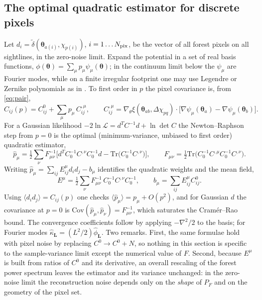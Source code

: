 \documentclass[11pt,a4paper]{article}
\newcommand{\dt}{\tilde\delta}
\newcommand{\vL}{\bm{L}}
\newcommand{\vth}{\bm{\theta}}
\newcommand{\Tr}{\mathrm{Tr}}
\begin{document}
\subsection{The optimal quadratic estimator for discrete pixels}
\label{sec:discrete}

Let $d_i=\dt(\vth_{a(i)},\chi_{p(i)})$, $i=1\dots N_{\rm pix}$, be the vector of all forest pixels on all sightlines, in the zero-noise limit. Expand the potential in a set of real basis functions, $\phi(\vth)=\sum_\mu p_\mu\psi_\mu(\vth)$; in the continuum limit below the $\psi_\mu$ are Fourier modes, while on a finite irregular footprint one may use Legendre or Zernike polynomials as in \citet{2005.04109}. To first order in $p$ the pixel covariance is, from \eqref{eq:pair},
\begin{equation}
C_{ij}(p)=C^0_{ij}+\sum_\mu p_\mu\,C^{,\mu}_{ij},\qquad
C^{,\mu}_{ij}=\nabla_\theta\xi(\vth_{ab},\Delta\chi_{pq})\cdot\big[\nabla\psi_\mu(\vth_a)-\nabla\psi_\mu(\vth_b)\big].
\label{eq:Cderiv}
\end{equation}
For a Gaussian likelihood $-2\ln\mathcal L=d^TC^{-1}d+\ln\det C$ the Newton--Raphson step from $p=0$ is the optimal (minimum-variance, unbiased to first order) quadratic estimator,
\begin{equation}
\hat p_\mu=\tfrac12\sum_\nu F^{-1}_{\mu\nu}\Big[d^TC_0^{-1}C^{,\nu}C_0^{-1}d-\Tr\big(C_0^{-1}C^{,\nu}\big)\Big],
\qquad
F_{\mu\nu}=\tfrac12\Tr\big(C_0^{-1}C^{,\mu}C_0^{-1}C^{,\nu}\big).
\label{eq:qe}
\end{equation}
Writing $\hat p_\mu=\sum_{ij}E^\mu_{ij}d_id_j-b_\mu$ identifies the quadratic weights and the mean field,
\begin{equation}
E^\mu=\tfrac12\sum_\nu F^{-1}_{\mu\nu}\,C_0^{-1}C^{,\nu}C_0^{-1},\qquad b_\mu=\sum_{ij}E^\mu_{ij}C^0_{ij}.
\label{eq:E}
\end{equation}
Using $\langle d_id_j\rangle=C_{ij}(p)$ one checks $\langle\hat p_\mu\rangle=p_\mu+O(p^2)$, and for Gaussian $d$ the covariance at $p=0$ is $\mathrm{Cov}(\hat p_\mu,\hat p_\nu)=F^{-1}_{\mu\nu}$, which saturates the Cram\'er--Rao bound. The convergence coefficients follow by applying $-\nabla^2/2$ to the basis; for Fourier modes $\hat\kappa_{\vL}=(L^2/2)\hat\phi_{\vL}$. Two remarks. First, the same formulae hold with pixel noise by replacing $C^0\to C^0+N$, so nothing in this section is specific to the sample-variance limit except the numerical value of $F$. Second, because $E^\mu$ is built from ratios of $C^0$ and its derivative, an overall rescaling of the forest power spectrum leaves the estimator and its variance unchanged: in the zero-noise limit the reconstruction noise depends only on the \emph{shape} of $P_F$ and on the geometry of the pixel set.
\end{document}
